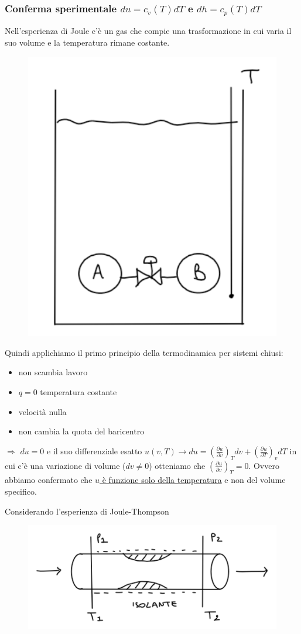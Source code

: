 \documentclass[a4paper]{article}
\numberwithin{equation}{section}%
\begin{document}
\subsubsection{Conferma sperimentale $d u=c_{v}(T) d T$ e $dh=c_{p}(T) d T$}

Nell'esperienza di Joule c'è un gas che compie una trasformazione in cui varia il suo volume e la temperatura rimane costante.

\begin{figure}[H]
	\begin{center}
		\includegraphics[width=0.3\columnwidth]{confermasperimentale.png}
	\end{center}
\end{figure}

Quindi applichiamo il primo principio della termodinamica per sistemi chiusi:
\begin{itemize}
\item non scambia lavoro
\item $q=0$ temperatura costante
\item velocità nulla
\item non cambia la quota del baricentro
\end{itemize}

$\Longrightarrow$ $du=0$ e il suo differenziale esatto $ u(v, T) \rightarrow d u=\left(\frac{\partial u}{\partial v}\right)_{T} d v+\left(\frac{\partial u}{\partial T}\right)_{v} d T$ in cui c'è una variazione di volume ($dv\neq 0$) otteniamo che $\left(\frac{\partial u}{\partial v}\right)_{T}=0$. Ovvero abbiamo confermato che \underline{$u$ è funzione solo della temperatura} e non del volume specifico.
\newline

Considerando l'esperienza di Joule-Thompson 

\begin{figure}[H]
	\begin{center}
		\includegraphics[width=0.3\columnwidth]{jouleT.png}
	\end{center}
\end{figure}
\end{document}
